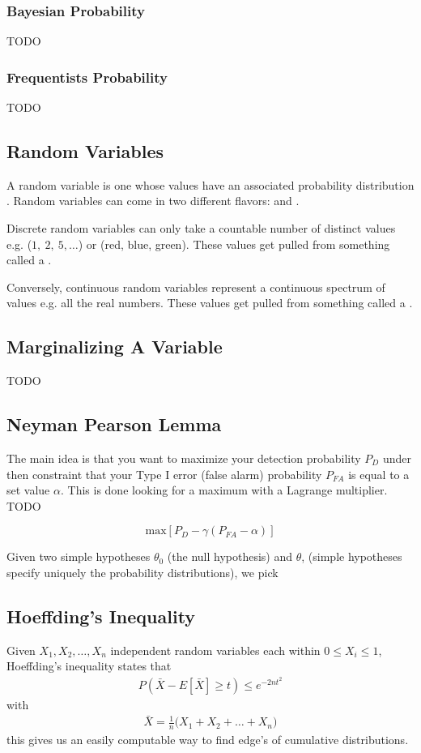\subsubsection{Bayesian Probability}
TODO
\subsubsection{Frequentists Probability}
TODO



\subsection{Random Variables}
A random variable is one whose values have an associated probability distribution \cite{grus}. Random variables can come in two different flavors:  and . 

Discrete random variables can only take a countable number of distinct values e.g. ($1,~2, ~5,\ldots$) or (red, blue, green). These values get pulled from something called a .

Conversely, continuous random variables represent a continuous spectrum of values e.g. all the real numbers. These values get pulled from something called a .

\subsection{Marginalizing A Variable}
TODO

\subsection{Neyman Pearson Lemma}
The main idea is that you want to maximize your detection probability $P_D$ under then constraint that your Type I error (false alarm) probability $P_{FA}$ is equal to a set value $\alpha$. This is done looking for a maximum with a Lagrange multiplier. TODO

\begin{equation}
	\textrm{max}[P_D - \gamma(P_{FA}-\alpha)]
\end{equation}

Given two simple hypotheses $\theta_0$ (the null hypothesis) and $\theta$, (simple hypotheses specify uniquely the probability distributions), we pick 

\subsection{Hoeffding's Inequality}\label{hoeffding}
Given $X_1, X_2, \ldots, X_n$ independent random variables each within $0 \leq X_i \leq 1$, Hoeffding's inequality states that 
\begin{align}
	P(\bar{X} - E[\bar{X}] \geq t) \leq e^{-2nt^2}
\end{align}
with 
\begin{align}
	\bar{X} = \frac{1}{n}\Big(X_1+X_2+\ldots+X_n\Big)
\end{align}
this gives us an easily computable way to find edge's of cumulative distributions.
 
